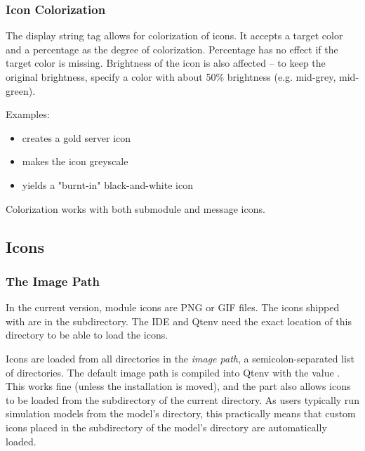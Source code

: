 \subsubsection{Icon Colorization}
\label{sec:graphics:displaystring-icon-colorization}

The  display string tag allows for colorization of icons.
It accepts a target color and a percentage as the degree of colorization.
Percentage has no effect if the target color is missing.
Brightness of the icon is also affected -- to keep the original brightness,
specify a color with about 50\% brightness (e.g.  mid-grey,
 mid-green).

Examples:

\begin{itemize}
  \item {} creates a gold server icon
  \item {} makes the icon greyscale
  \item {} yields a "burnt-in" black-and-white icon
\end{itemize}

Colorization works with both submodule and message icons.


\subsection{Icons}
\label{sec:graphics:icon-library}

\subsubsection{The Image Path}
\label{sec:graphics:image-path}

In the current {\opp} version, module icons are PNG or GIF files. The icons shipped
with {\opp} are in the  subdirectory. The IDE and Qtenv
need the exact location of this directory to be able to load the icons.

Icons are loaded from all directories in the \textit{image path},
a semicolon-separated list of directories.
The default image path is compiled into Qtenv with the value
. This works fine (unless the
{\opp} installation is moved), and the  part also allows
icons to be loaded from the  subdirectory of the current
directory. As users typically run simulation models from the model's
directory, this practically means that custom icons placed in the
 subdirectory of the model's directory are automatically
loaded.

